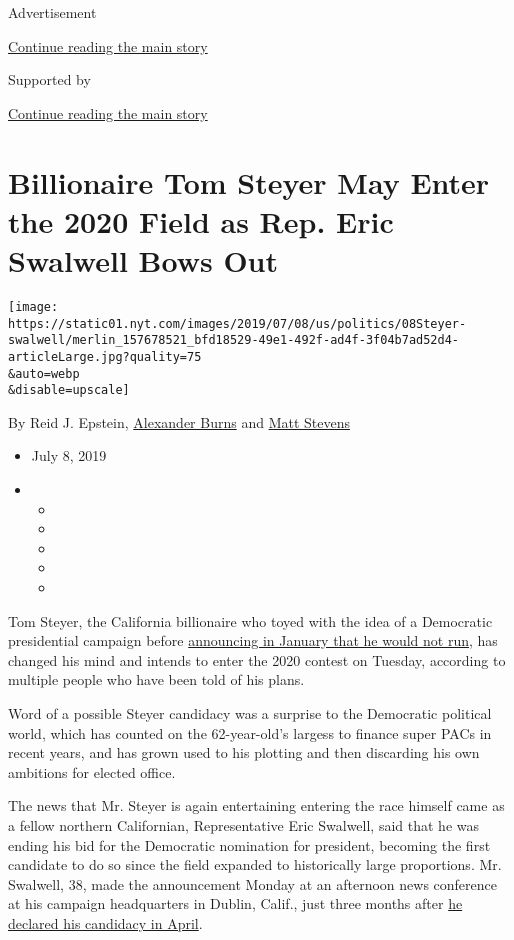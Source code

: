 Advertisement

\protect\hyperlink{after-top}{Continue reading the main story}

Supported by

\protect\hyperlink{after-sponsor}{Continue reading the main story}

\hypertarget{billionaire-tom-steyer-may-enter-the-2020-field-as-rep-eric-swalwell-bows-out}{%
\section{Billionaire Tom Steyer May Enter the 2020 Field as Rep. Eric
Swalwell Bows
Out}\label{billionaire-tom-steyer-may-enter-the-2020-field-as-rep-eric-swalwell-bows-out}}

\texttt{[image: https://static01.nyt.com/images/2019/07/08/us/politics/08Steyer-swalwell/merlin\_157678521\_bfd18529-49e1-492f-ad4f-3f04b7ad52d4-articleLarge.jpg?quality=75\\\&auto=webp\\\&disable=upscale]}

By Reid J. Epstein,
\href{https://www.nytimes.com/by/alexander-burns}{Alexander Burns} and
\href{https://www.nytimes.com/by/matt-stevens}{Matt Stevens}

\begin{itemize}
\item
  July 8, 2019
\item
  \begin{itemize}
  \item
  \item
  \item
  \item
  \item
  \end{itemize}
\end{itemize}

Tom Steyer, the California billionaire who toyed with the idea of a
Democratic presidential campaign before
\href{https://www.nytimes.com/2019/01/09/us/politics/tom-steyer-trump-2020.html}{announcing
in January that he would not run}, has changed his mind and intends to
enter the 2020 contest on Tuesday, according to multiple people who have
been told of his plans.

Word of a possible Steyer candidacy was a surprise to the Democratic
political world, which has counted on the 62-year-old's largess to
finance super PACs in recent years, and has grown used to his plotting
and then discarding his own ambitions for elected office.

The news that Mr. Steyer is again entertaining entering the race himself
came as a fellow northern Californian, Representative Eric Swalwell,
said that he was ending his bid for the Democratic nomination for
president, becoming the first candidate to do so since the field
expanded to historically large proportions. Mr. Swalwell, 38, made the
announcement Monday at an afternoon news conference at his campaign
headquarters in Dublin, Calif., just three months after
\href{https://www.nytimes.com/2019/04/08/us/politics/eric-swalwell-president-2020.html}{he
declared his candidacy in April}.

